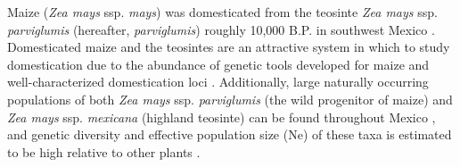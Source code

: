 \documentclass[12pt]{article}
\begin{document}
Maize (\emph{Zea mays} ssp. \emph{mays}) was domesticated from the teosinte \emph{Zea mays} ssp. \emph{parviglumis} (hereafter, \emph{parviglumis}) roughly 10,000 B.P. in southwest Mexico \cite{Piperno et al 2009, Matsuoka et al 2002}. Domesticated maize and the teosintes are an attractive system in which to study domestication due to the abundance of genetic tools developed for maize and well-characterized domestication loci \cite{Hufford et al 2012a, Doebley 2004, Hufford et al 2012b}. Additionally, large naturally occurring populations of both \emph{Zea mays} ssp. \emph{parviglumis} (the wild progenitor of maize) and \emph{Zea mays} ssp. \emph{mexicana} (highland teosinte) can be found throughout Mexico \cite{Wilkes 1977, Hufford et al 2013}, and genetic diversity and effective population size (Ne) of these taxa is estimated to be high \cite{Ross-Ibarra et al 2009} relative to other plants \cite{Nybom 2004}.
\end{document}

